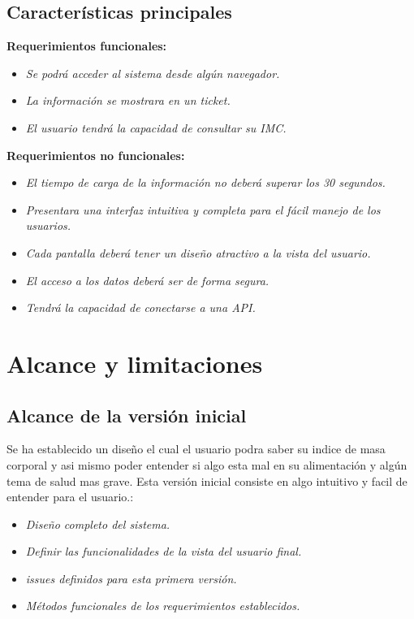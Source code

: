 \documentclass[12pt,a4paper]{book}
\begin{document}
\section{Características principales}
\vspace{0.5 cm}
\textbf {Requerimientos funcionales:}
\vspace{0.5 cm}
\begin{itemize}
\item \textit{Se podrá acceder al sistema desde algún navegador.}
\item \textit{La información se mostrara en un ticket.}
\item \textit{El usuario tendrá la capacidad de consultar su IMC.}
\end{itemize}
\newpage
\textbf {Requerimientos no funcionales:}
\vspace{0.5 cm}
\begin{itemize}
\item \textit{El tiempo de carga de la información no deberá superar los 30 segundos.}
\item \textit{Presentara una interfaz intuitiva y completa para el fácil manejo de los usuarios.}
\item \textit{Cada pantalla deberá tener un diseño atractivo a la vista del usuario.}
\item \textit{El acceso a los datos deberá ser de forma segura.}
\item \textit{Tendrá la capacidad de conectarse a una API.}
\end{itemize}

\chapter{Alcance y limitaciones}

\section{Alcance de la versión inicial}
\vspace{0.5 cm}
Se ha establecido un diseño el cual el usuario podra saber su indice de masa corporal y asi mismo poder entender si algo esta mal en su alimentación y algún tema de salud mas grave.
Esta versión inicial consiste en algo intuitivo y facil de entender para el usuario.: \\
\vspace{0.5 cm}
\begin{itemize}
\item \textit{Diseño completo del sistema.}
\item \textit{Definir las funcionalidades de la vista del usuario final.}
\item \textit{issues definidos para esta primera versión.}
\item \textit{Métodos funcionales de los requerimientos establecidos.}
\end{itemize} 
\newpage
\end{document}
